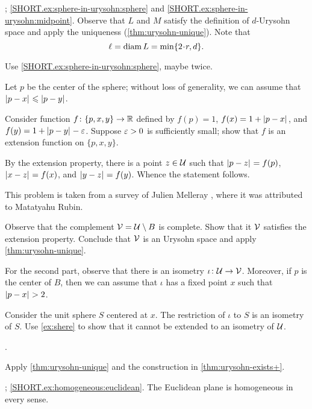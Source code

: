 


\parbf{\ref{ex:sphere-in-urysohn}}; \ref{SHORT.ex:sphere-in-urysohn:sphere} and \ref{SHORT.ex:sphere-in-urysohn:midpoint}.
Observe that $L$ and $M$ satisfy the definition of $d$-Urysohn space and apply the uniqueness (\ref{thm:urysohn-unique}).
Note that
\[\ell=\diam L=\min\{2\cdot r, d\}.\]

Use \ref{SHORT.ex:sphere-in-urysohn:sphere}, maybe twice.

Let $p$ be the center of the sphere;
without loss of generality, we can assume that $\dist{p}{x}{}\le \dist{p}{y}{}$.

Consider function $f\colon\{p,x,y\}\to\mathbb{R}$ defined by $f(p)=1$, $f(x)=1+\dist{p}{x}{}$, and $f(y)=1+\dist{p}{y}{}-\eps$.
Suppose $\varepsilon>0$ is sufficiently small;
show that $f$ is an extension function on $\{p,x,y\}$.

By the extension property, there is a point $z\in \mathcal{U}$ such that $\dist{p}{z}{}=f(p)$, $\dist{x}{z}{}=f(x)$, and $\dist{y}{z}{}=f(y)$.
Whence the statement follows.

 This problem is taken from a survey of Julien Melleray
 \cite[Prop. 4.3]{melleray}, where it was attributed to Matatyahu Rubin.


Observe that the complement $\mathcal{V}=\mathcal{U}\setminus B$ is complete.
Show that it $\mathcal{V}$ satisfies the extension property.
Conclude that $\mathcal{V}$ is an Urysohn space and apply \ref{thm:urysohn-unique}.

For the second part, observe that there is an isometry $\iota\colon\mathcal{U}\to \mathcal{V}$.
Moreover, if $p$ is the center of $B$, then we can assume that $\iota$ has a fixed point $x$ such that $\dist{p}{x}{}>2$.

Consider the unit sphere $S$ centered at $x$.
The restriction of $\iota$ to $S$ is an isometry of $S$.
Use \ref{ex:shere} to show that it cannot be extended to an isometry of $\mathcal{U}$.

 \cite[Sec. 4.4]{melleray}.

Apply \ref{thm:urysohn-unique} and the construction in \ref{thm:urysohn-exists+}.

\parbf{\ref{ex:homogeneous}}; \ref{SHORT.ex:homogeneous:euclidean}.
The Euclidean plane is homogeneous in every sense.

